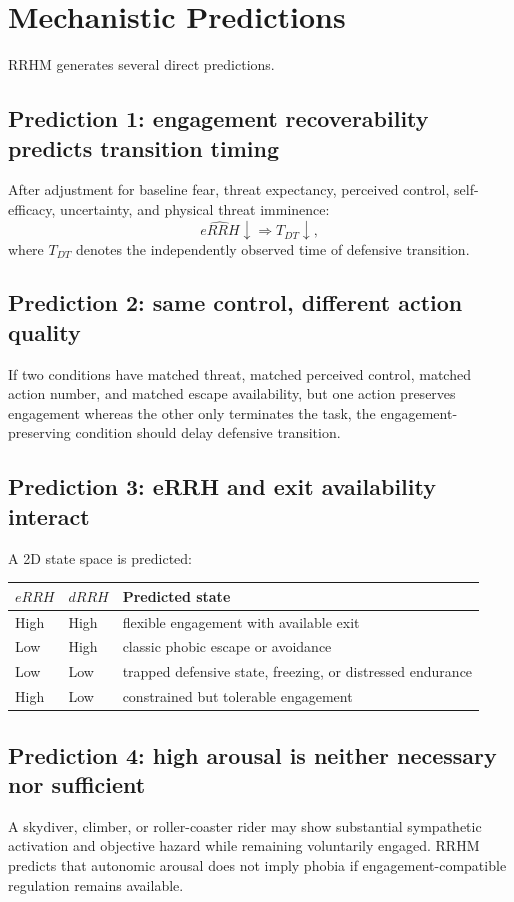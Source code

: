 \documentclass[11pt]{article}
\begin{document}
\section{Mechanistic Predictions}
RRHM generates several direct predictions.

\subsection{Prediction 1: engagement recoverability predicts transition timing}
After adjustment for baseline fear, threat expectancy, perceived control, self-efficacy, uncertainty, and physical threat imminence:
\[
\widehat{eRRH}\downarrow\Rightarrow T_{DT}\downarrow,
\]
where $T_{DT}$ denotes the independently observed time of defensive transition.

\subsection{Prediction 2: same control, different action quality}
If two conditions have matched threat, matched perceived control, matched action number, and matched escape availability, but one action preserves engagement whereas the other only terminates the task, the engagement-preserving condition should delay defensive transition.

\subsection{Prediction 3: eRRH and exit availability interact}
A 2D state space is predicted:
\begin{center}
\begin{tabular}{lll}
\toprule
$eRRH$ & $dRRH$ & Predicted state \\
\midrule
High & High & flexible engagement with available exit \\
Low & High & classic phobic escape or avoidance \\
Low & Low & trapped defensive state, freezing, or distressed endurance \\
High & Low & constrained but tolerable engagement \\
\bottomrule
\end{tabular}
\end{center}

\subsection{Prediction 4: high arousal is neither necessary nor sufficient}
A skydiver, climber, or roller-coaster rider may show substantial sympathetic activation and objective hazard while remaining voluntarily engaged. RRHM predicts that autonomic arousal does not imply phobia if engagement-compatible regulation remains available.
\end{document}
